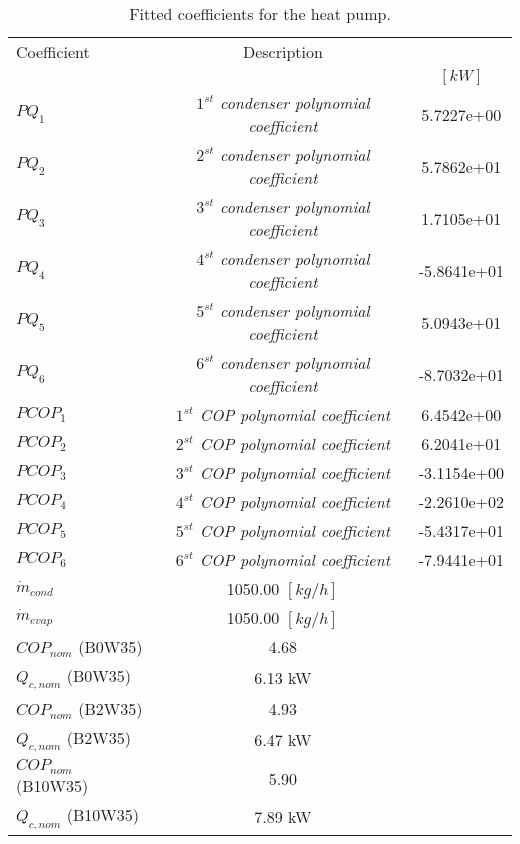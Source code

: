 \documentclass[english]{SPFShortReport}
\author{Dani Carbonell}
\begin{document}
\begin{table}[!ht]
\begin{small}
\caption{Fitted coefficients for the heat pump.}
\begin{center}
\resizebox{12cm}{!} 
{
\begin{tabular}{l | c c } 
\hline
\hline
Coefficient &Description & \\ 
 & &$[kW]$\\ 
\hline
$PQ_{1}$ & \emph{$1^{st}$ condenser polynomial coefficient}  & 5.7227e+00    \\ 
$PQ_{2}$ & \emph{$2^{st}$ condenser polynomial coefficient}  & 5.7862e+01    \\ 
$PQ_{3}$ & \emph{$3^{st}$ condenser polynomial coefficient}  & 1.7105e+01    \\ 
$PQ_{4}$ & \emph{$4^{st}$ condenser polynomial coefficient}  & -5.8641e+01    \\ 
$PQ_{5}$ & \emph{$5^{st}$ condenser polynomial coefficient}  & 5.0943e+01    \\ 
$PQ_{6}$ & \emph{$6^{st}$ condenser polynomial coefficient}  & -8.7032e+01    \\ 
\hline
$PCOP_{1}$ & \emph{$1^{st}$ COP polynomial coefficient}  & 6.4542e+00    \\ 
$PCOP_{2}$ & \emph{$2^{st}$ COP polynomial coefficient}  & 6.2041e+01    \\ 
$PCOP_{3}$ & \emph{$3^{st}$ COP polynomial coefficient}  & -3.1154e+00    \\ 
$PCOP_{4}$ & \emph{$4^{st}$ COP polynomial coefficient}  & -2.2610e+02    \\ 
$PCOP_{5}$ & \emph{$5^{st}$ COP polynomial coefficient}  & -5.4317e+01    \\ 
$PCOP_{6}$ & \emph{$6^{st}$ COP polynomial coefficient}  & -7.9441e+01    \\ 
\hline
$\dot m_{cond}$ & 1050.00 $[kg/h]$\\ 
$\dot m_{evap}$ & 1050.00 $[kg/h]$\\ 
\hline
$COP_{nom}$ (B0W35)& 4.68 \\ 
$Q_{c,nom}$ (B0W35)& 6.13 kW\\ 
$COP_{nom}$ (B2W35)& 4.93 \\ 
$Q_{c,nom}$ (B2W35)& 6.47 kW\\ 
$COP_{nom}$ (B10W35)& 5.90 \\ 
$Q_{c,nom}$ (B10W35)& 7.89 kW\\ 
\hline
\hline
\end{tabular}
}
\label{CoefTable}
\end{center}
\end{small}
\end{table}
\end{document}
